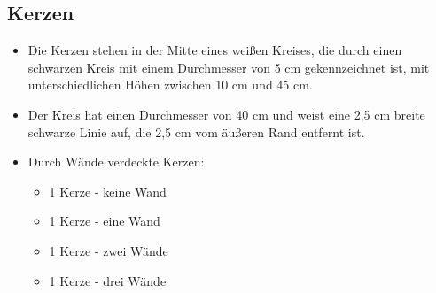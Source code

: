 \documentclass[a4paper,12pt]{article}
\begin{document}
\subsection{Kerzen}
\begin{itemize}
	\item Die Kerzen stehen in der Mitte eines weißen Kreises, die durch einen schwarzen Kreis mit einem Durchmesser von 5 cm gekennzeichnet ist, mit unterschiedlichen Höhen zwischen 10 cm und 45 cm.
	\item  Der Kreis hat einen Durchmesser von 40 cm und weist eine 2,5 cm breite schwarze Linie auf, die 2,5 cm vom äußeren Rand entfernt ist.
	\item Durch Wände verdeckte Kerzen:
	\begin{itemize}
		\item 1 Kerze - keine Wand
		\item 1 Kerze - eine Wand
		\item 1 Kerze - zwei Wände
		\item 1 Kerze - drei Wände
	\end{itemize}
\end{itemize}
\end{document}
